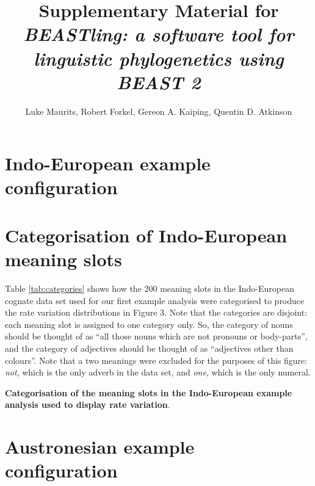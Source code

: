 \documentclass[10pt,a4paper]{article}
\begin{document}
\title{Supplementary Material for \emph{BEASTling: a software tool for linguistic phylogenetics using BEAST 2}}
\author{Luke Maurits, Robert Forkel, Gereon A. Kaiping, Quentin D. Atkinson}
\maketitle

\section{Indo-European example configuration}

\begin{alltt}

\end{alltt}

\section{Categorisation of Indo-European meaning slots}

Table \ref{tab:categories} shows how the 200 meaning slots in the Indo-European cognate data set used for our first example analysis were categorised to produce the rate variation distributions in Figure 3.  Note that the categories are disjoint: each meaning slot is assigned to one category only.  So, the category of nouns should be thought of as ``all those nouns which are not pronouns or body-parts'', and the category of adjectives should be thought of as ``adjectives other than colours''.  Note that a two meanings were excluded for the purposes of this figure: \emph{not}, which is the only adverb in the data set, and \emph{one}, which is the only numeral. 

\begin{table}[]
	\begin{center}
	\small
	
	\end{center}
	\caption{\textbf{Categorisation of the meaning slots in the Indo-European example analysis used to display rate variation}.}
\label{tab:categories}
\end{table}

\section{Austronesian example configuration}

\begin{alltt}

\end{alltt}
\end{document}
